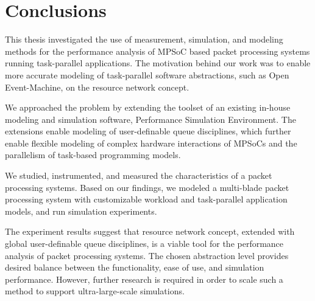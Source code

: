 \chapter{Conclusions}
\label{chapter:conclusions}

This thesis investigated the use of measurement, simulation, and modeling methods for the performance analysis of MPSoC based packet processing systems running task-parallel applications. The motivation behind our work was to enable more accurate modeling of task-parallel software abstractions, such as Open Event-Machine, on the resource network concept.

We approached the problem by extending the toolset of an existing in-house modeling and simulation software, Performance Simulation Environment. The extensions enable modeling of user-definable queue disciplines, which further enable flexible modeling of complex hardware interactions of MPSoCs and the parallelism of task-based programming models.

We studied, instrumented, and measured the characteristics of a packet processing systems. Based on our findings, we modeled a multi-blade packet processing system with customizable workload and task-parallel application models, and run simulation experiments.

The experiment results suggest that resource network concept, extended with global user-definable queue disciplines, is a viable tool for the performance analysis of packet processing systems. The chosen abstraction level provides desired balance between the functionality, ease of use, and simulation performance. However, further research is required in order to scale such a method to support ultra-large-scale simulations.

